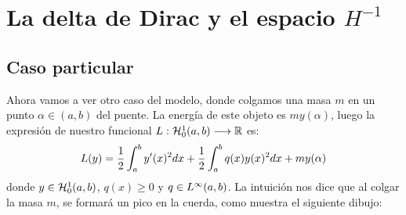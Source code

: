 \section{La delta de Dirac y el espacio $H^{-1}$}
\subsection{Caso particular}
Ahora vamos a ver otro caso del modelo, donde colgamos una masa $m$ en un punto $\alpha\in(a,b)$ del puente. La energía de este objeto es $my(\alpha)$, luego la expresión de nuestro funcional $L : \mathcal{H}_0^{ 1 } (a,b) \longrightarrow \mathbb{R}$ es:
\[
L(y)=\frac{1}{2}\displaystyle\int_{ a }^{ b } y'(x)^2dx+\frac{1}{2}\displaystyle\int_{ a }^{ b } q(x)y(x)^2dx+my(\alpha)
\]
donde $y\in\mathcal{H}_0^{ 1 } (a,b)$, $q(x)\geq 0$ y  $q\in L^{ \infty }(a,b)$. La intuición nos dice que al colgar la masa $m$, se formará un pico en la cuerda, como muestra el siguiente dibujo:

